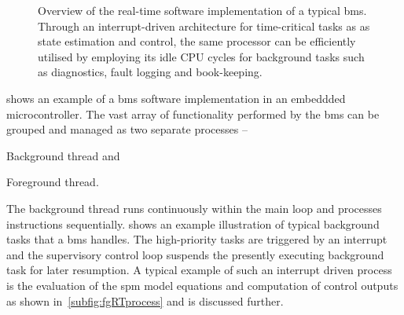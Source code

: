 \begin{figure}[tbh]
{\begin{varwidth}[b]{0.65\linewidth}
\begin{flushright}
\begin{algorithmic}[0]
                \EndFunction
                \EndFunction
                \END
            \end{algorithmic}
            \end{flushright}
        \end{varwidth}%
    }
    \centering
    \caption[Overview of real-time software implementation of a typical
    ]{Overview of the real-time software implementation of a typical
        \gls{bms}. Through an interrupt-driven architecture for time-critical tasks as
        as state estimation and control, the same processor can be
        efficiently utilised by employing its idle CPU cycles for background
        tasks such as diagnostics, fault logging and book-keeping.}
    \label{fig:basicRTCsoftwarearch}
\end{figure}

  shows  an  example   of  a  \gls{bms}  software
implementation in an embeddded microcontroller. The vast array of functionality
performed by the \gls{bms} can be grouped and managed as two separate processes --
\begin{enumerate*}[label=\itshape\alph*\upshape)]
    \item Background thread and
    \item Foreground thread.
\end{enumerate*}
The   background   thread  runs   continuously   within   the  main   loop   and
processes instructions sequentially.   shows an example
illustration  of  typical  background  tasks   that  a  \gls{bms}  handles.  The
high-priority tasks  are triggered by  an interrupt and the  supervisory control
loop suspends  the presently executing  background task for later  resumption. A
typical  example of  such  an  interrupt driven  process  is  the evaluation  of
the  \gls{spm} model  equations  and  computation of  control  outputs as  shown
in~\cref{subfig:fgRTprocess} and is discussed further.

